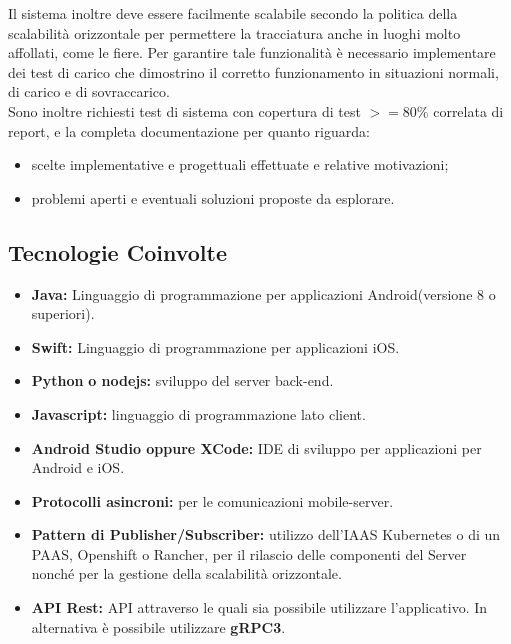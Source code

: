 	Il sistema inoltre deve essere facilmente scalabile secondo la politica della scalabilità orizzontale per permettere la tracciatura anche in luoghi molto affollati, come le fiere. Per garantire tale funzionalità è necessario implementare dei test di carico che dimostrino il corretto funzionamento in situazioni normali, di carico e di sovraccarico.\\
	Sono inoltre richiesti test di sistema con copertura di test $>=80\%$ correlata di report, e la completa documentazione per quanto riguarda:
	\begin{itemize}
		\item scelte implementative e progettuali effettuate e relative motivazioni;
		\item problemi aperti e eventuali soluzioni proposte da esplorare. 
	\end{itemize}
	\subsection{Tecnologie Coinvolte}
	\begin{itemize}
		\item \textbf{Java}\textbf{:} Linguaggio di programmazione per applicazioni Android(versione 8 o superiori).
		\item \textbf{Swift}\textbf{:} Linguaggio di programmazione per applicazioni iOS.
		\item \textbf{Python} \textbf{o nodejs}\textbf{:} sviluppo del server back-end.
		\item \textbf{Javascript}\textbf{:} linguaggio di programmazione lato client.
		\item \textbf{Android Studio oppure XCode:} IDE di sviluppo per applicazioni per Android e iOS.
		\item \textbf{Protocolli asincroni:} per le comunicazioni mobile-server.
		\item \textbf{Pattern di Publisher/Subscriber:} utilizzo dell’IAAS Kubernetes o di un PAAS, Openshift o Rancher, per il rilascio delle componenti del Server nonché per la gestione della scalabilità orizzontale.
		\item \textbf{API Rest}\textbf{:} API attraverso le quali sia possibile utilizzare l'applicativo. In alternativa è possibile utilizzare \textbf{gRPC3}.
	\end{itemize}
	
